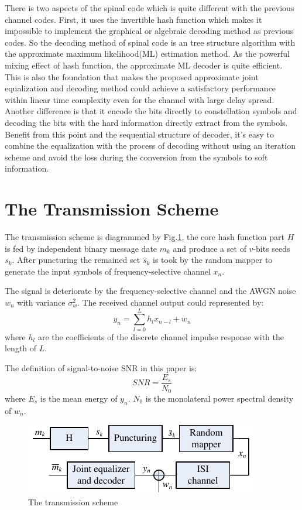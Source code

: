 \documentclass[conference]{IEEEtran}
\begin{document}
There is two aspects of the spinal code which is quite different with the previous channel codes. First, it uses the invertible hash function which makes it impossible to  implement the graphical or algebraic decoding method as previous codes. So the decoding method of spinal code is an tree structure algorithm with the approximate maximum likelihood(ML) estimation method. As the powerful mixing effect of hash function, the approximate ML decoder is quite efficient. This is also the foundation that makes the proposed approximate joint equalization and decoding method could achieve a satisfactory performance within linear time complexity even for the channel with large delay spread.  
Another difference is that it encode the bits directly to constellation symbols and decoding the bits with the hard information directly extract from the symbols. Benefit from this point and the sequential structure of decoder, it's easy to combine the equalization with the process of decoding without using an iteration scheme and avoid the loss during the conversion from the symbols to soft information.  
\section{The Transmission Scheme}
The transmission scheme is diagrammed by Fig.\ref{fig_tranScheme}, the core hash function part $H$ is fed by independent binary message date $m_k$ and produce a set of $v$-bits seeds $s_k$. After puncturing the remained set $\widehat{s}_k$ is took by the random mapper to generate the input symbols of frequency-selective channel $x_n$. 

The signal is deteriorate by the frequency-selective channel and the AWGN noise $w_n$ with variance $\sigma^2_w$. The received channel output could represented by:
\begin{equation}
y_n=\sum_{l=0}^Lh_lx_{n-l}+w_n 
\label{equ_yn}
\end{equation}
where $h_l$ are the coefficients of the discrete channel impulse response with the length of $L$. 

The definition of signal-to-noise SNR in this paper is:
\begin{equation}
SNR=\frac{E_s}{N_0}
\label{equ_snr}
\end{equation}
where $E_s$ is the mean energy of $y_n$. $N_0$ is the monolateral power spectral density of $w_n$.
\begin{figure}[!t]
\centering
\includegraphics[width=3.0 in]{tranScheme.pdf}
\caption{The transmission scheme}
\label{fig_tranScheme}
\end{figure}
\end{document}
